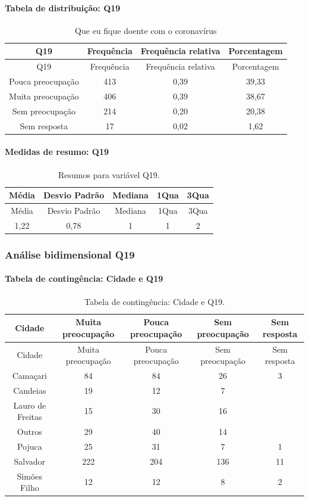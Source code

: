 \documentclass[]{article}
\let\oldparagraph\paragraph
\renewcommand{\paragraph}[1]{\oldparagraph{#1}\mbox{}}
\begin{document}
\hypertarget{tabela-de-distribuiuxe7uxe3o-q19}{%
\paragraph{Tabela de distribuição: Q19}\label{tabela-de-distribuiuxe7uxe3o-q19}}

\begin{longtable}[]{@{}cccc@{}}
\caption{\label{tab:unnamed-chunk-248}Que eu fique doente com o coronavírus}\tabularnewline
\toprule
Q19 & Frequência & Frequência relativa & Porcentagem\tabularnewline
\midrule
\endfirsthead
\toprule
Q19 & Frequência & Frequência relativa & Porcentagem\tabularnewline
\midrule
\endhead
Pouca preocupação & 413 & 0,39 & 39,33\tabularnewline
Muita preocupação & 406 & 0,39 & 38,67\tabularnewline
Sem preocupação & 214 & 0,20 & 20,38\tabularnewline
Sem resposta & 17 & 0,02 & 1,62\tabularnewline
\bottomrule
\end{longtable}

\hypertarget{medidas-de-resumo-q19}{%
\paragraph{Medidas de resumo: Q19}\label{medidas-de-resumo-q19}}

\begin{longtable}[]{@{}ccccc@{}}
\caption{\label{tab:unnamed-chunk-249}Resumos para variável Q19.}\tabularnewline
\toprule
Média & Desvio Padrão & Mediana & 1Qua & 3Qua\tabularnewline
\midrule
\endfirsthead
\toprule
Média & Desvio Padrão & Mediana & 1Qua & 3Qua\tabularnewline
\midrule
\endhead
1,22 & 0,78 & 1 & 1 & 2\tabularnewline
\bottomrule
\end{longtable}

\cleardoublepage

\hypertarget{anuxe1lise-bidimensional-q19}{%
\subsubsection{Análise bidimensional Q19}\label{anuxe1lise-bidimensional-q19}}

\hypertarget{tabela-de-continguxeancia-cidade-e-q19}{%
\paragraph{Tabela de contingência: Cidade e Q19}\label{tabela-de-continguxeancia-cidade-e-q19}}

\begin{longtable}[]{@{}ccccc@{}}
\caption{\label{tab:unnamed-chunk-250}Tabela de contingência: Cidade e Q19.}\tabularnewline
\toprule
Cidade & Muita preocupação & Pouca preocupação & Sem preocupação & Sem resposta\tabularnewline
\midrule
\endfirsthead
\toprule
Cidade & Muita preocupação & Pouca preocupação & Sem preocupação & Sem resposta\tabularnewline
\midrule
\endhead
Camaçari & 84 & 84 & 26 & 3\tabularnewline
Candeias & 19 & 12 & 7 &\tabularnewline
Lauro de Freitas & 15 & 30 & 16 &\tabularnewline
Outros & 29 & 40 & 14 &\tabularnewline
Pojuca & 25 & 31 & 7 & 1\tabularnewline
Salvador & 222 & 204 & 136 & 11\tabularnewline
Simões Filho & 12 & 12 & 8 & 2\tabularnewline
\bottomrule
\end{longtable}
\end{document}
